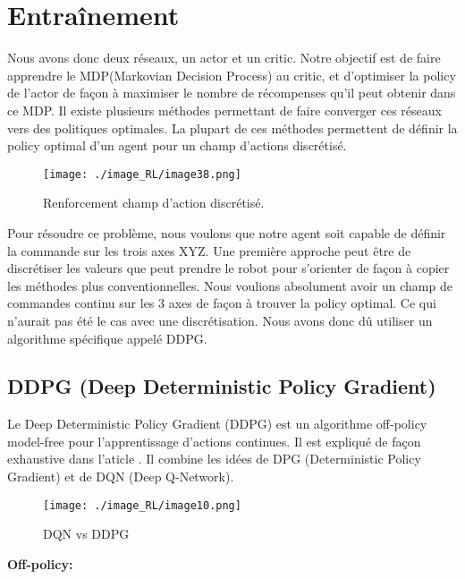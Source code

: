 \section{Entraînement}
Nous avons donc deux réseaux, un actor et un critic.
Notre objectif est de faire apprendre le MDP(Markovian Decision Process) au critic, et d’optimiser la policy de l’actor de façon à maximiser le nombre de récompenses qu’il peut obtenir dans ce MDP.
Il existe plusieurs méthodes permettant de faire converger ces réseaux vers des politiques optimales. 
La plupart de ces méthodes permettent de définir la policy optimal d’un agent pour un champ d’actions discrétisé.

\begin{figure}[H]
    \centering
    \texttt{[image: ./image\_RL/image38.png]}
    \caption{ Renforcement champ d’action discrétisé. }
\end{figure}

Pour résoudre ce problème, nous voulons que notre agent soit capable de définir la commande sur les trois axes XYZ. Une première approche peut être de discrétiser les valeurs que peut prendre le robot pour s’orienter de façon à copier les méthodes plus conventionnelles.
Nous voulions absolument avoir un champ de commandes continu sur les 3 axes de façon à trouver la policy optimal. Ce qui n’aurait pas été le cas avec une discrétisation.
Nous avons donc dû utiliser un algorithme spécifique appelé DDPG.

\subsection{DDPG (Deep Deterministic Policy Gradient)}
Le Deep Deterministic Policy Gradient (DDPG) est un algorithme off-policy model-free pour l'apprentissage d'actions continues.
Il est expliqué de façon exhaustive dans l’aticle \cite{pmlr-v48-mniha16}.
Il combine les idées de DPG (Deterministic Policy Gradient) et de DQN (Deep Q-Network). 

\begin{figure}[H]
    \centering
    \texttt{[image: ./image\_RL/image10.png]}
    \caption{  DQN vs DDPG  }
\end{figure}

\textbf{Off-policy:}

